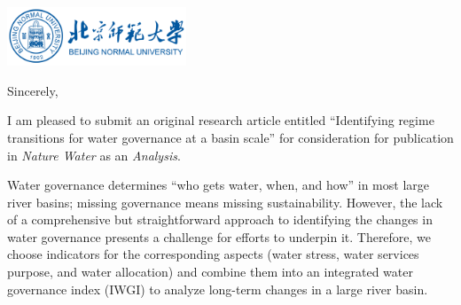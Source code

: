\documentclass[11pt,a4paper,roman]{moderncv}
\begin{document}
\begin{minipage}[t]{\textwidth}
\includegraphics[width=0.40\textwidth]{bnu}
\end{minipage}


\opening{\vspace*{-2em}}
\closing{Sincerely,}{\vspace*{-2em}}
\makelettertitle

I am pleased to submit an original research article entitled ``Identifying regime transitions for water governance at a basin scale'' for consideration for publication in \textit{Nature Water} as an \textit{Analysis}.

Water governance determines ``who gets water, when, and how'' in most large river basins; missing governance means missing sustainability. However, the lack of a comprehensive but straightforward approach to identifying the changes in water governance presents a challenge for efforts to underpin it. Therefore, we choose indicators for the corresponding aspects (water stress, water services purpose, and water allocation) and combine them into an integrated water governance index (IWGI) to analyze long-term changes in a large river basin.

\end{document}
